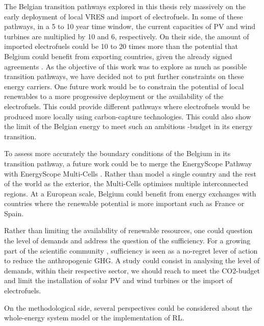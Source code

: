 The Belgian transition pathways explored in this thesis rely massively on the early deployment of local \gls{VRES} and import of electrofuels. In some of these pathways, in a 5 to 10 year time window, the current capacities of \gls{PV} and wind turbines are multiplied by 10 and 6, respectively. On their side, the amount of imported electrofuels could be 10 to 20 times more than the potential that Belgium could benefit from exporting countries, given the already signed agreements \cite{lefebvre2022electrofuel}. As the objective of this work was to explore as much as possible transition pathways, we have decided not to put further constraints on these energy carriers. One future work would be to constrain the potential of local renewables to a more progressive deployment or the availability of the electrofuels. This could provide different pathways where electrofuels would be produced more locally using carbon-capture technologies. This could also show the limit of the Belgian energy to meet such an ambitious -budget in its energy transition. 

To assess more accurately the boundary conditions of the Belgium in its transition pathway, a future work could be to merge the EnergyScope Pathway with EnergyScope Multi-Cells \cite{thiran2023validation}. Rather than model a single country and the rest of the world as the exterior, the Multi-Cells optimises multiple interconnected regions. At a European scale, Belgium could benefit from energy exchanges with countries where the renewable potential is more important such as France or Spain. 

Rather than limiting the availability of renewable resources, one could question the level of demands and address the question of the sufficiency. For a growing part of the scientific community \cite{o2018good}, sufficiency is seen as a no-regret lever of action to reduce the anthropogenic \gls{GHG}. A study could consist in analysing the level of demands, within their respective sector, we should reach to meet the \gls{CO2}-budget and limit the installation of solar PV and wind turbines or the import of electrofuels.

On the methodological side, several perspectives could be considered about the whole-energy system model or the implementation of \gls{RL}.

